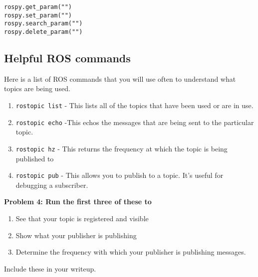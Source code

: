 \begin{lstlisting}
rospy.get_param("")
rospy.set_param("")
rospy.search_param("")
rospy.delete_param("")
\end{lstlisting}

\subsection{Helpful ROS commands}
Here is a list of ROS commands that you will use often to understand what topics are being used.
\begin{enumerate}
	\item \texttt{rostopic list} - This lists all of the topics that have been used or are in use.
	\item \texttt{rostopic echo} -This echos the messages that are being sent to the particular topic.
	\item \texttt{rostopic hz} - This returns the frequency at which the topic is being published to
	\item \texttt{rostopic pub} - This allows you to publish to a topic. It's useful for debugging a subscriber.
\end{enumerate}

{\bf Problem 4: Run the first three of these to
\begin{enumerate}[label=(\alph*)]
    \item See that your topic is registered and visible
    \item Show what your publisher is publishing
    \item Determine the frequency with which your publisher is publishing messages.
\end{enumerate}
Include these in your writeup.}